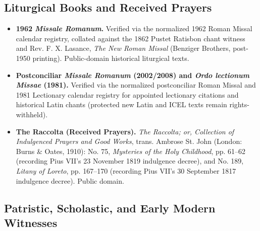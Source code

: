 \subsection{Liturgical Books and Received Prayers}

\begin{itemize}
  \item \textbf{1962 \textit{Missale Romanum}.} Verified via the normalized 1962 Roman Missal calendar registry, collated against the 1862 Pustet Ratisbon chant witness and Rev. F. X. Lasance, \textit{The New Roman Missal} (Benziger Brothers, post-1950 printing). Public-domain historical liturgical texts.
  \item \textbf{Postconciliar \textit{Missale Romanum} (2002/2008) and \textit{Ordo lectionum Missae} (1981).} Verified via the normalized postconciliar Roman Missal and 1981 Lectionary calendar registry for appointed lectionary citations and historical Latin chants (protected new Latin and ICEL texts remain rights-withheld).
  \item \textbf{The Raccolta (Received Prayers).} \textit{The Raccolta; or, Collection of Indulgenced Prayers and Good Works}, trans. Ambrose St. John (London: Burns \& Oates, 1910): No. 75, \textit{Mysteries of the Holy Childhood}, pp. 61--62 (recording Pius VII's 23 November 1819 indulgence decree), and No. 189, \textit{Litany of Loreto}, pp. 167--170 (recording Pius VII's 30 September 1817 indulgence decree). Public domain.
\end{itemize}

\subsection{Patristic, Scholastic, and Early Modern Witnesses}

